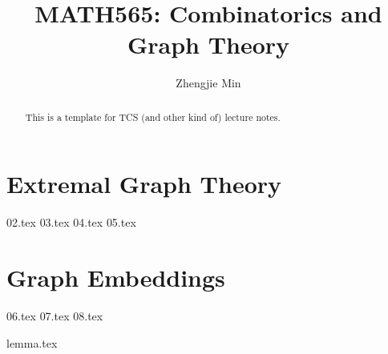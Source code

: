 \documentclass[a4paper]{report}
\author{Zhengjie Min}
\title{MATH565: Combinatorics and Graph Theory}
\begin{document}
\maketitle

\begin{abstract}
	This is a template for TCS (and other kind of) lecture notes.
\end{abstract}

\newpage

\tableofcontents

\part{Extremal Graph Theory}

{02.tex}
{03.tex}
{04.tex}
{05.tex}

\part{Graph Embeddings}

{06.tex}
{07.tex}
{08.tex}

\newpage
\appendix
\appendixpage{}

{lemma.tex}
%

\newpage
\pagestyle{plain}
\printbibliography{}
\end{document}
